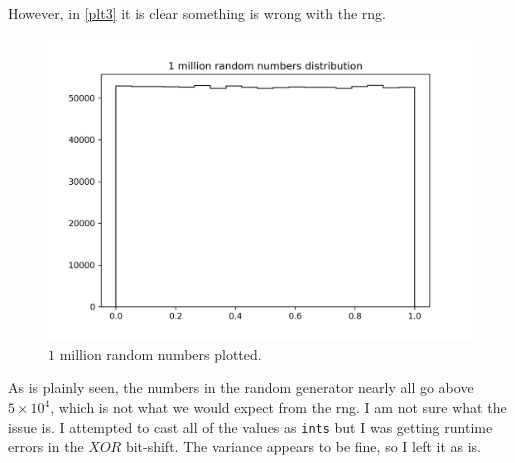 However, in \autoref{plt3} it is clear something is wrong with the rng.
\begin{figure}[h!]
    \centering
    \includegraphics[width=0.9\linewidth]{./plots/1mil_hist.png}
    \caption{$1$ million random numbers plotted.}
    \label{plt3}
\end{figure}
As is plainly seen, the numbers in the random generator nearly all go above 
$5 \times 10^4$, which is not what we would expect from the rng. I am not
sure what the issue is. I attempted to cast all of the values as \texttt{ints}
but I was getting runtime errors in the $XOR$ bit-shift. The variance appears
to be fine, so I left it as is.

